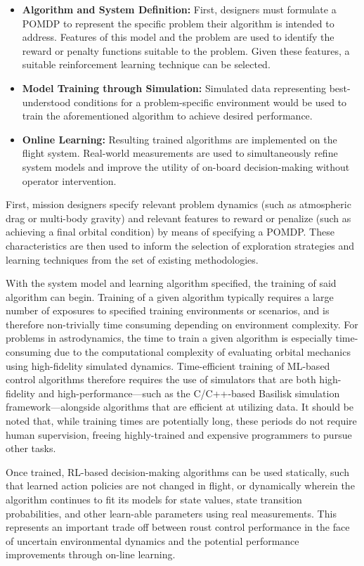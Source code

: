 \documentclass[paper,11pt]{AAS}		%
\begin{document}
\begin{itemize}
	\item \textbf{Algorithm and System Definition:} First, designers must formulate a POMDP to represent the specific problem their algorithm is intended to address. Features of this model and the problem are used to identify the reward or penalty functions suitable to the problem. Given these features, a suitable reinforcement learning technique can be selected.
	\item \textbf{Model Training through Simulation:} Simulated data representing best-understood conditions for a problem-specific environment would be used to train the aforementioned algorithm to achieve desired performance.
	\item \textbf{Online Learning:} Resulting trained algorithms are implemented on the flight system. Real-world measurements are used to simultaneously refine system models and improve the utility of on-board decision-making without operator intervention.
\end{itemize}

First, mission designers specify relevant problem dynamics (such as atmospheric drag or multi-body gravity) and relevant features to reward or penalize (such as achieving a final orbital condition) by means of specifying a POMDP. These characteristics are then used to inform the selection of exploration strategies and learning techniques from the set of existing methodologies.

With the system model and learning algorithm specified, the training of said algorithm can begin. Training of a given algorithm typically requires a large number of exposures to specified training environments or scenarios, and is therefore non-trivially time consuming depending on environment complexity. For problems in astrodynamics, the time to train a given algorithm is especially time-consuming due to the computational complexity of evaluating orbital mechanics using high-fidelity simulated dynamics. Time-efficient training of ML-based control algorithms therefore requires the use of simulators that are both high-fidelity and high-performance---such as the C/C++-based Basilisk simulation framework\cite{Alcorn2016}---alongside algorithms that are efficient at utilizing data. It should be noted that, while training times are potentially long, these periods do not require human supervision, freeing highly-trained and expensive programmers to pursue other tasks.

Once trained, RL-based decision-making algorithms can be used statically, such that learned action policies are not changed in flight, or dynamically wherein the algorithm continues to fit its models for state values, state transition probabilities, and other learn-able parameters using real measurements. This represents an important trade off between roust control performance in the face of uncertain environmental dynamics and the potential performance improvements through on-line learning.
\end{document}
